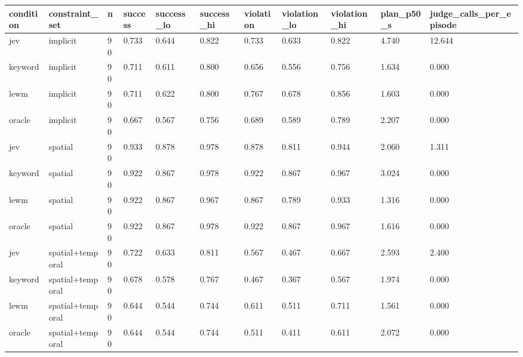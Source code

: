 \begin{tabular}{lllllllllll}
\toprule
condition & constraint\_set & n & success & success\_lo & success\_hi & violation & violation\_lo & violation\_hi & plan\_p50\_s & judge\_calls\_per\_episode \\
\midrule
jev & implicit & 90 & 0.733 & 0.644 & 0.822 & 0.733 & 0.633 & 0.822 & 4.740 & 12.644 \\
keyword & implicit & 90 & 0.711 & 0.611 & 0.800 & 0.656 & 0.556 & 0.756 & 1.634 & 0.000 \\
lewm & implicit & 90 & 0.711 & 0.622 & 0.800 & 0.767 & 0.678 & 0.856 & 1.603 & 0.000 \\
oracle & implicit & 90 & 0.667 & 0.567 & 0.756 & 0.689 & 0.589 & 0.789 & 2.207 & 0.000 \\
jev & spatial & 90 & 0.933 & 0.878 & 0.978 & 0.878 & 0.811 & 0.944 & 2.060 & 1.311 \\
keyword & spatial & 90 & 0.922 & 0.867 & 0.978 & 0.922 & 0.867 & 0.967 & 3.024 & 0.000 \\
lewm & spatial & 90 & 0.922 & 0.867 & 0.967 & 0.867 & 0.789 & 0.933 & 1.316 & 0.000 \\
oracle & spatial & 90 & 0.922 & 0.867 & 0.978 & 0.922 & 0.867 & 0.967 & 1.616 & 0.000 \\
jev & spatial+temporal & 90 & 0.722 & 0.633 & 0.811 & 0.567 & 0.467 & 0.667 & 2.593 & 2.400 \\
keyword & spatial+temporal & 90 & 0.678 & 0.578 & 0.767 & 0.467 & 0.367 & 0.567 & 1.974 & 0.000 \\
lewm & spatial+temporal & 90 & 0.644 & 0.544 & 0.744 & 0.611 & 0.511 & 0.711 & 1.561 & 0.000 \\
oracle & spatial+temporal & 90 & 0.644 & 0.544 & 0.744 & 0.511 & 0.411 & 0.611 & 2.072 & 0.000 \\
\bottomrule
\end{tabular}